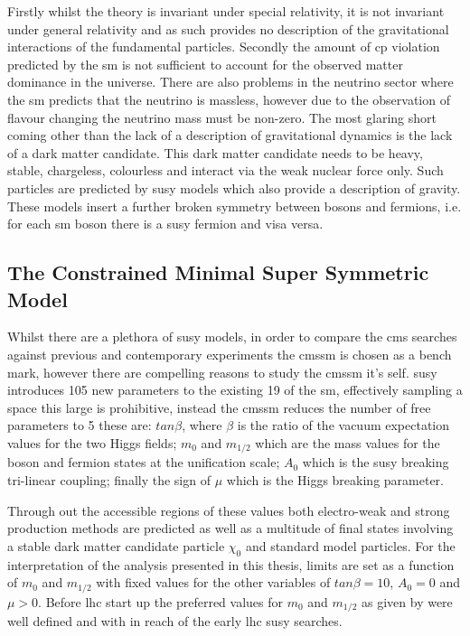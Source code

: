 Firstly whilst the theory is invariant under special relativity, it is not invariant under general relativity and as such provides no description of the gravitational interactions of the fundamental particles. 
Secondly the amount of \ac{cp} violation predicted by the \ac{sm} is not sufficient to account for the observed matter dominance in the universe.
There are also problems in the neutrino sector where the \ac{sm} predicts that the neutrino is massless, however due to the observation of flavour changing the neutrino mass must be non-zero.
The most glaring short coming other than the lack of a description of gravitational dynamics is the lack of a dark matter candidate. This dark matter candidate needs to be heavy, stable, chargeless, colourless and interact via the weak nuclear force only. Such particles are predicted by \ac{susy}\cite{} models which also provide a description of gravity. These models insert a further broken symmetry between bosons and fermions, i.e. for each \ac{sm} boson there is a \ac{susy} fermion and visa versa.



\subsection{The Constrained Minimal Super Symmetric Model} %
\label{sec:the_constrained_minimal_super_symmetric_model}
Whilst there are a plethora of \ac{susy} models, in order to compare the \ac{cms} searches against previous and contemporary experiments the \ac{cmssm} is chosen as a bench mark, however there are compelling reasons to study the \ac{cmssm} it's self. \ac{susy} introduces 105 new parameters to the existing 19 of the \ac{sm}, effectively sampling a space this large is prohibitive, instead the \ac{cmssm} reduces the number of free parameters to 5 these are: $tan \beta$, where $\beta$ is the ratio of the vacuum expectation values for the two Higgs fields; $m_{0}$ and $m_{1/2}$ which are the mass values for the boson and fermion states at the unification scale; $A_{0}$ which is the \ac{susy} breaking tri-linear coupling; finally the sign of $\mu$ which is the  Higgs breaking parameter.

Through out the accessible regions of these values both electro-weak and strong production methods are predicted as well as a multitude of final states involving a stable dark matter candidate particle $\chi_{0}$ and standard model particles. For the interpretation of the analysis presented in this thesis, limits are set as a function of $m_{0}$ and $m_{1/2}$ with fixed values for the other variables of $tan \beta = 10$, $A_{0} = 0$ and $\mu > 0$.
Before \ac{lhc} start up the preferred values for $m_{0}$ and $m_{1/2}$ as given by \cite{mastercode} were well defined and with in reach of the early \ac{lhc} \ac{susy} searches.

